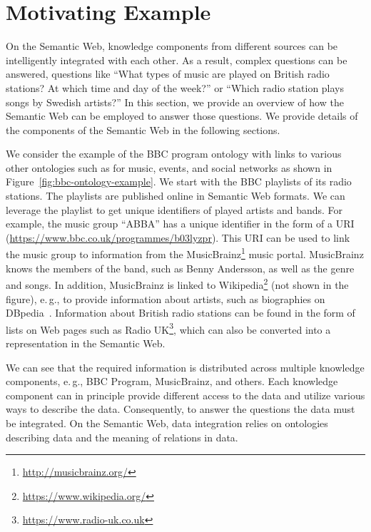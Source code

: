 \documentclass[a4paper,USenglish]{tgdk-v2021}
\newcommand{\myurl}[1]{\footnote{\url{#1}}}
\begin{document}
\section{Motivating Example}
\label{sec:musicscenario}

On the Semantic Web, knowledge components from different sources can be intelligently integrated with each other.
As a result, complex questions can be answered, questions like ``What types of music are played on British radio stations? At which time and day of the week?'' or ``Which radio station plays songs by Swedish artists?''
In this section, we provide an overview of how the Semantic Web can be employed to answer those questions. We provide details of the components of the Semantic Web in the following sections.

We consider the example of the BBC program ontology with links to various other ontologies such as for music, events, and social networks as shown in Figure~\ref{fig:bbc-ontology-example}.
We start with the BBC playlists of its radio stations.
The playlists are published online in Semantic Web formats.
We can leverage the playlist to get unique identifiers of played artists and bands. For example, the music group ``ABBA'' has a unique identifier in the form of a URI (\url{https://www.bbc.co.uk/programmes/b03lyzpr}). 
This URI can be used to link the music group to information from the MusicBrainz\myurl{http://musicbrainz.org/} music portal.
MusicBrainz knows the members of the band, such as Benny Andersson, as well as the genre and songs.
In addition, MusicBrainz is linked to Wikipedia\myurl{https://www.wikipedia.org/} (not shown in the figure), e.\,g., to provide information about artists, such as biographies on DBpedia~\cite{key:dbpedia}.
Information about British radio stations can be found in the form of lists on Web pages such as Radio UK\myurl{https://www.radio-uk.co.uk}, which can also be converted into a representation in the Semantic Web.

We can see that the required information is distributed across multiple knowledge components, e.\,g., BBC Program, MusicBrainz, and others.
Each knowledge component can in principle provide different access to the data and utilize various ways to describe the data.
Consequently, to answer the questions the data must be integrated.
On the Semantic Web, data integration relies on ontologies describing data and the meaning of relations in data.
\end{document}
